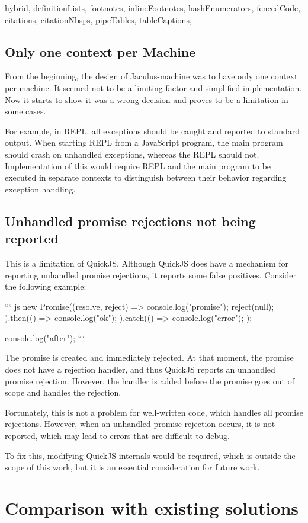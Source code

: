 \documentclass[
  digital,
  oneside,
  nosansbold,
  nocolorbold,
  lof,
  lot
]{fithesis4}
\begin{document}
\begin{markdown*}{%
  hybrid,
  definitionLists,
  footnotes,
  inlineFootnotes,
  hashEnumerators,
  fencedCode,
  citations,
  citationNbsps,
  pipeTables,
  tableCaptions,
}
\section{Only one context per Machine}
From the beginning, the design of Jaculus-machine was to have only one context per machine. It seemed not to be a limiting factor and simplified implementation. Now it starts to show it was a wrong decision and proves to be a limitation in some cases.

For example, in REPL, all exceptions should be caught and reported to standard output. When starting REPL from a JavaScript program, the main program should crash on unhandled exceptions, whereas the REPL should not. Implementation of this would require REPL and the main program to be executed in separate contexts to distinguish between their behavior regarding exception handling.


\section{Unhandled promise rejections not being reported}
This is a limitation of QuickJS. Although QuickJS does have a mechanism for reporting unhandled promise rejections, it reports some false positives. Consider the following example:

``` js
new Promise((resolve, reject) => {
    console.log("promise");
    reject(null);
}).then(() => {
    console.log("ok");
}).catch(() => {
    console.log("error");
});

console.log("after");
```

The promise is created and immediately rejected. At that moment, the promise does not have a rejection handler, and thus QuickJS reports an unhandled promise rejection. However, the handler is added before the promise goes out of scope and handles the rejection.

Fortunately, this is not a problem for well-written code, which handles all promise rejections. However, when an unhandled promise rejection occurs, it is not reported, which may lead to errors that are difficult to debug.

To fix this, modifying QuickJS internals would be required, which is outside the scope of this work, but it is an essential consideration for future work.





\chapter{Comparison with existing solutions}


\end{markdown*}
\end{document}
